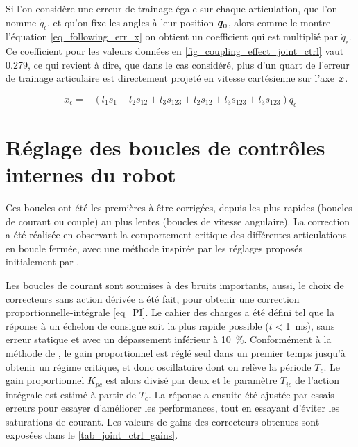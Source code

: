 \begin{appendices}
	Si l'on considère une erreur de trainage égale sur chaque articulation, que l'on nomme $ \dot{q}_\epsilon $, et qu'on fixe les angles à leur position $ \vect{q}_0 $, alors comme le montre l'équation \cref{eq_following_err_x} on obtient un coefficient qui est multiplié par $ \dot{q}_\epsilon $. Ce coefficient pour les valeurs données en \cref{fig_coupling_effect_joint_ctrl} vaut 0.279, ce qui revient à dire, que dans le cas considéré, plus d'un quart de l'erreur de trainage articulaire est directement projeté en vitesse cartésienne sur l'axe $ \vect{x} $.
	
	\begin{equation} \label{eq_following_err_x}
		\dot{x}_\epsilon = -(l_1 s_1 + l_2 s_{12} + l_3 s_{123} + l_2 s_{12} + l_3 s_{123} + l_3 s_{123}) \dot{q}_\epsilon
	\end{equation}

	\chapter{Réglage des boucles de contrôles internes du robot} \label{app_inner_loop_tunning}

	
	Ces boucles ont été les premières à être corrigées, depuis les plus rapides (boucles de courant ou couple) au plus lentes (boucles de vitesse angulaire). La correction a été réalisée en observant la comportement critique des différentes articulations en boucle fermée, avec une méthode inspirée par les réglages proposés initialement par \textcite{ziegler_optimum_1942}. 
	
	
	
	Les boucles de courant sont soumises à des bruits importants, aussi, le choix de correcteurs sans action dérivée a été fait, pour obtenir une correction proportionnelle-intégrale \cref{eq_PI}. Le cahier des charges a été défini tel que la réponse à un échelon de consigne soit la plus rapide possible ($t<$\SI{1}{\milli\second}), sans erreur statique et avec un dépassement inférieur à \SI{10}{\percent}. Conformément à la méthode de \textcite{ziegler_optimum_1942}, le gain proportionnel est réglé seul dans un premier temps jusqu'à obtenir un régime critique, et donc oscillatoire dont on relève la période $T_c$. Le gain proportionnel $K_{pc}$ est alors divisé par deux et le paramètre $T_{ic}$ de l'action intégrale est estimé à partir de $T_c$. La réponse a ensuite été ajustée par essais-erreurs pour essayer d'améliorer les performances, tout en essayant d'éviter les saturations de courant. Les valeurs de gains des correcteurs obtenues sont exposées dans le \cref{tab_joint_ctrl_gains}.
	

\end{appendices}
